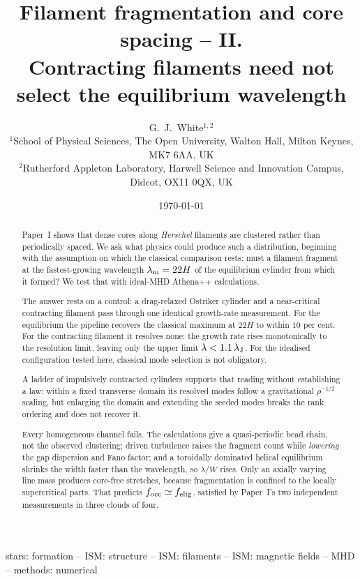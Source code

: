 \documentclass[usenatbib,twoside,twocolumn]{mnras}
\title[Filament fragmentation and core spacing -- II]{Filament fragmentation and core spacing -- II.\\ Contracting filaments need not select the equilibrium wavelength}
\author[G.~J.~White]{G.~J.~White$^{1,2}$\\
$^{1}$School of Physical Sciences, The Open University, Walton Hall, Milton Keynes, MK7 6AA, UK\\
$^{2}$Rutherford Appleton Laboratory, Harwell Science and Innovation Campus, Didcot, OX11 0QX, UK}
\date{\today}
\begin{document}
\label{firstpage}
\maketitle

\begin{abstract}

Paper~I shows that dense cores along \textit{Herschel} filaments are clustered rather than periodically spaced. We ask what physics could produce such a distribution, beginning with the assumption on which the classical comparison rests: must a filament fragment at the fastest-growing wavelength $\lambda_{\rm m}=22H$ of the equilibrium cylinder from which it formed? We test that with ideal-MHD Athena++ calculations.

The answer rests on a control: a drag-relaxed Ostriker cylinder and a near-critical contracting filament pass through one identical growth-rate measurement. For the equilibrium the pipeline recovers the classical maximum at $22H$ to within $10$ per cent. For the contracting filament it resolves none: the growth rate rises monotonically to the resolution limit, leaving only the upper limit $\lambda<1.1\,\lambda_{\rm J}$. For the idealised configuration tested here, classical mode selection is not obligatory.

A ladder of impulsively contracted cylinders supports that reading without establishing a law: within a fixed transverse domain its resolved modes follow a gravitational $\rho^{-1/2}$ scaling, but enlarging the domain and extending the seeded modes breaks the rank ordering and does not recover it.

Every homogeneous channel fails. The calculations give a quasi-periodic bead chain, not the observed clustering; driven turbulence raises the fragment count while \emph{lowering} the gap dispersion and Fano factor; and a toroidally dominated helical equilibrium shrinks the width faster than the wavelength, so $\lambda/W$ rises. Only an axially varying line mass produces core-free stretches, because fragmentation is confined to the locally supercritical parts. That predicts $f_{\rm occ}\simeq f_{\rm elig}$, satisfied by Paper~I's two independent measurements in three clouds of four.

\end{abstract}

\begin{keywords}
stars: formation -- ISM: structure -- ISM: filaments -- ISM: magnetic fields -- MHD -- methods: numerical
\end{keywords}
\end{document}
